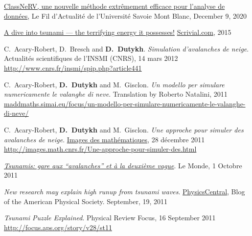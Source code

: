 \begin{etaremune}

  \item \href{https://www.univ-smb.fr/2020/12/09/classnerv-une-nouvelle-methode-extremement-efficace-pour-lanalyse-de-donnees/}{ClassNeRV, une nouvelle m\'ethode extr\^emement efficace pour l'analyse de donn\'ees}, Le Fil d'Actualit\'e de l'Universit\'e Savoie Mont Blanc, December 9, 2020

  \item \href{http://www.scrivial.com/articles/a-dive-into-tsunami-the-terrifying-energy-it-possesses}{A dive into tsunami --- the terrifying energy it possesses!} \href{http://www.scrivial.com/}{Scrivial.com}, 2015
  
  \item C.~Acary-Robert, D.~Bresch and \textbf{D.~Dutykh}. \textit{Simulation d'avalanches de neige}. Actualit\'es scientifiques de l'INSMI (CNRS), 14 mars 2012 \\
  \url{http://www.cnrs.fr/insmi/spip.php?article441}
  
  \item C.~Acary-Robert, \textbf{D.~Dutykh} and M.~Gisclon. \textit{Un modello per simulare numericamente le valanghe di neve}. Translation by Roberto Natalini, 2011 \\
  {\small\url{maddmaths.simai.eu/focus/un-modello-per-simulare-numericamente-le-valanghe-di-neve/}}

  \item C.~Acary-Robert, \textbf{D.~Dutykh} and M.~Gisclon. \textit{Une approche pour simuler des avalanches de neige}. \href{http://images.math.cnrs.fr/}{Images des math\'ematiques}, 28 d\'ecembre 2011 \\
  \url{http://images.math.cnrs.fr/Une-approche-pour-simuler-des.html}
  
  \item \href{https://www.lemonde.fr/planete/article/2011/09/29/tsunamis-gare-aux-avalanches-et-a-la-deuxieme-vague_1580151_3244.html}{\textit{Tsunamis: gare aux ``avalanches'' et \`a la deuxi\`eme vague}}. Le Monde, 1 Octobre 2011

  \item \textit{New research may explain high runup from tsunami waves}. \href{http://physicsbuzz.physicscentral.com/2011/09/new-research-may-explain-high-runup.html}{PhysicsCentral}, Blog of the American Physical Society. September, 19, 2011

  \item \textit{Tsunami Puzzle Explained}. Physical Review Focus, 16 September 2011 \\
  \url{http://focus.aps.org/story/v28/st11}
  

\end{etaremune}
